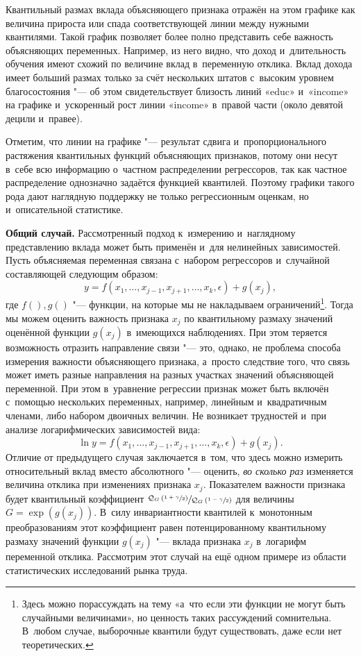 \documentclass[11pt]{article}
\begin{document}
Квантильный размах вклада объясняющего признака отражён на этом графике как величина прироста или спада соответствующей линии между нужными квантилями. Такой график позволяет более полно представить себе важность объясняющих переменных. Например, из него видно, что доход и~длительность обучения имеют схожий по величине вклад в~переменную отклика. Вклад дохода имеет больший размах только за счёт нескольких штатов с~высоким уровнем благосостояния "--- об этом свидетельствует близость линий «educ» и~«income» на графике и~ускоренный рост линии «income» в~правой части (около девятой децили и~правее).

Отметим, что линии на графике "--- результат сдвига и~пропорционального растяжения квантильных функций объясняющих признаков, потому они несут в~себе всю информацию о~частном распределении регрессоров, так как частное распределение однозначно задаётся функцией квантилей. Поэтому графики такого рода дают наглядную поддержку не только регрессионным оценкам, но и~описательной статистике.

{\bf Общий случай.} Рассмотренный подход к~измерению и~наглядному представлению вклада может быть применён и~для нелинейных зависимостей. Пусть объясняемая переменная связана с~набором регрессоров и~случайной составляющей следующим образом:
\begin{equation}\label{eq:1}
y = f(x_1,\ldots,x_{j-1},x_{j+1},\ldots, x_k, \epsilon) + g(x_j),
\end{equation}
где $f(), g()$ "--- функции, на которые мы не накладываем ограничений\footnote{Здесь можно порассуждать на тему «а~что если эти функции не могут быть случайными величинами», но ценность таких рассуждений сомнительна. В~любом случае, выборочные квантили будут существовать, даже если нет теоретических.}\fnnsp. Тогда мы можем оценить важность признака $x_j$ по квантильному размаху значений оценённой функции $g(x_j)$ в~имеющихся наблюдениях. При этом теряется возможность отразить направление связи "--- это, однако, не проблема способа измерения важности объясняющего признака, а~просто следствие того, что связь может иметь разные направления на разных участках значений объясняющей переменной. При этом в~уравнение регрессии признак может быть включён с~помощью нескольких переменных, например, линейным и~квадратичным членами, либо набором двоичных величин. Не возникает трудностей и~при анализе логарифмических зависимостей вида:
\begin{equation}\label{eq:2}
\ln y = f(x_1,\ldots,x_{j-1},x_{j+1},\ldots, x_k, \epsilon) + g(x_j).
\end{equation}
Отличие от предыдущего случая заключается в~том, что здесь можно измерить относительный вклад вместо абсолютного "--- оценить, {\it во сколько раз} изменяется величина отклика при изменениях признака $x_j$. Показателем важности признака будет квантильный коэффициент $\sfrac{\mathcal{Q}_G\left(\sfrac{1+\gamma}{2}\right)}{\mathcal{Q}_G\left(\sfrac{1-\gamma}{2}\right)}$ для величины $G = \exp(g(x_j))$. В~силу инвариантности квантилей к~монотонным преобразованиям этот коэффициент равен потенцированному квантильному размаху значений функции $g(x_j)$ "--- вклада признака $x_j$ в~логарифм переменной отклика. Рассмотрим этот случай на ещё одном примере из области статистических исследований рынка труда.
\end{document}

